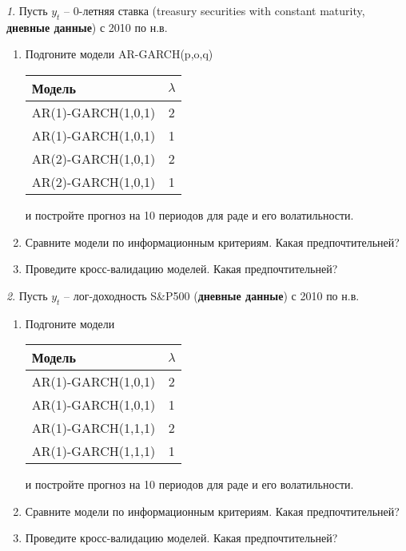 \documentclass[12pt]{article}
\theoremstyle{remark}
\newtheorem{exercise}{}[subsection]
\begin{document}
\begin{exercise}
Пусть \(y_t\) -- 0-летняя ставка (treasury securities  with constant maturity, \textbf{дневные данные}) с 2010 по н.в.
\begin{enumerate}
	\item Подгоните модели AR-GARCH(p,o,q)
	\begin{center}
	\begin{tabular}{l|c}
		Модель & \(\lambda\) \\ \hline
		AR(1)-GARCH(1,0,1) & 2 \\
		AR(1)-GARCH(1,0,1) & 1 \\
		AR(2)-GARCH(1,0,1) & 2 \\
		AR(2)-GARCH(1,0,1) & 1 \\ \hline
	\end{tabular}
	\end{center} 
	и постройте прогноз на 10 периодов для раде и его волатильности.
	\item Сравните модели по информационным критериям. Какая предпочтительней?
	\item Проведите кросс-валидацию моделей. Какая предпочтительней?
\end{enumerate}
\end{exercise}


\begin{exercise}
Пусть \(y_t\) -- лог-доходность S\&P500 (\textbf{дневные данные}) с 2010 по н.в.
\begin{enumerate}
	\item Подгоните модели
	\begin{center}
	\begin{tabular}{l|c}
		Модель & \(\lambda\) \\ \hline
		AR(1)-GARCH(1,0,1) & 2 \\
		AR(1)-GARCH(1,0,1) & 1 \\
		AR(1)-GARCH(1,1,1) & 2 \\
		AR(1)-GARCH(1,1,1) & 1 \\ \hline
	\end{tabular}
	\end{center} 
	и постройте прогноз на 10 периодов для раде и его волатильности. 
	\item Сравните модели по информационным критериям. Какая предпочтительней?
	\item Проведите кросс-валидацию моделей. Какая предпочтительней?
\end{enumerate}
\end{exercise}
\end{document}

